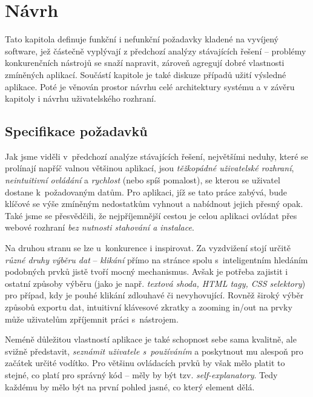 \documentclass[thesis=B,czech]{FITthesis}[2012/06/26]
\begin{document}

\chapter{Návrh}
Tato kapitola definuje funkční i nefunkční požadavky kladené na vyvíjený software, jež částečně vyplývají z předchozí analýzy stávajících řešení -- problémy konkurenčních nástrojů se snaží napravit, zároveň agregují dobré vlastnosti zmíněných aplikací. Součástí kapitole je také diskuze případů užití výsledné aplikace. Poté je věnován prostor návrhu celé architektury systému a v závěru kapitoly i návrhu uživatelského rozhraní.


\label{sec:requirements_specification}
\section{Specifikace požadavků}
Jak jsme viděli v~předchozí analýze stávajících řešení, největšími neduhy, které se prolínají napříč valnou většinou aplikací, jsou \emph{těžkopádné uživatelské rozhraní}, \emph{neintuitivní ovládání} a \emph{rychlost} (nebo spíš pomalost), se kterou se uživatel dostane k~požadovaným datům. Pro aplikaci, jíž se tato práce zabývá, bude klíčové se výše zmíněným nedostatkům vyhnout a nabídnout jejich přesný opak. Také jsme se přesvědčili, že nejpříjemnější cestou je celou aplikaci ovládat přes webové rozhraní  \emph{bez nutnosti stahování a instalace}.

Na druhou stranu se lze u~konkurence i inspirovat. Za vyzdvižení stojí určitě \emph{různé druhy výběru dat} -- \emph{klikání} přímo na stránce spolu s~inteligentním hledáním podobných prvků jistě tvoří mocný mechanismus. Avšak je potřeba zajistit i ostatní způsoby výběru (jako je např. \emph{textová shoda, HTML tagy, CSS selektory}) pro případ, kdy je pouhé klikání zdlouhavé či nevyhovující. Rovněž široký výběr způsobů exportu dat, intuitivní klávesové zkratky a zooming in/out na prvky může uživatelům zpříjemnit práci s~nástrojem.

Neméně důležitou vlastností aplikace je také schopnost sebe sama kvalitně, ale svižně představit, \emph{seznámit uživatele s~používáním} a poskytnout mu alespoň pro začátek určité vodítko. Pro většinu ovládacích prvků by však mělo platit to stejné, co platí pro správný kód -- měly by být tzv. \emph{self-explanatory}. Tedy každému by mělo být na první pohled jasné, co který element dělá.
\end{document}

